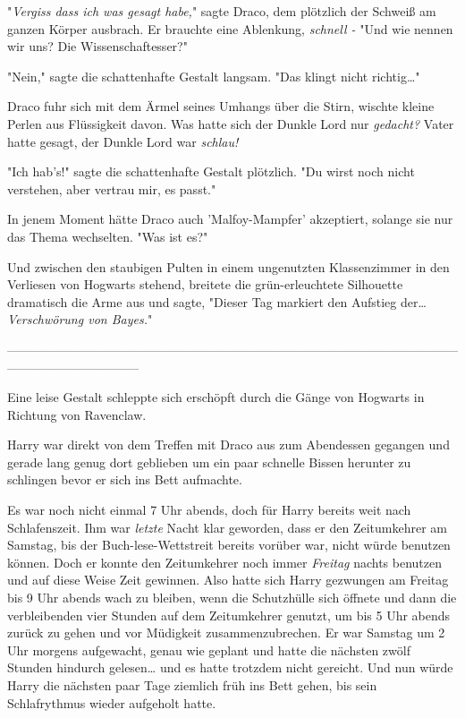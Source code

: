 {"\emph{Vergiss dass ich was gesagt habe,}" sagte Draco, dem plötzlich der Schweiß am ganzen Körper ausbrach. Er brauchte eine Ablenkung, \emph{schnell -} "Und wie nennen wir uns? Die Wissenschaftesser?"

"Nein," sagte die schattenhafte Gestalt langsam. "Das klingt nicht richtig…"

Draco fuhr sich mit dem Ärmel seines Umhangs über die Stirn, wischte kleine Perlen aus Flüssigkeit davon. Was hatte sich der Dunkle Lord nur \emph{gedacht?} Vater hatte gesagt, der Dunkle Lord war \emph{schlau!}

"Ich hab's!" sagte die schattenhafte Gestalt plötzlich. "Du wirst noch nicht verstehen, aber vertrau mir, es passt."

In jenem Moment hätte Draco auch 'Malfoy-Mampfer' akzeptiert, solange sie nur das Thema wechselten. "Was ist es?"

Und zwischen den staubigen Pulten in einem ungenutzten Klassenzimmer in den Verliesen von Hogwarts stehend, breitete die grün-erleuchtete Silhouette dramatisch die Arme aus und sagte, "Dieser Tag markiert den Aufstieg der… \emph{Verschwörung von Bayes.}"

--------------------------------------------------------------------------------------------------------------------------------------------

Eine leise Gestalt schleppte sich erschöpft durch die Gänge von Hogwarts in Richtung von Ravenclaw.

Harry war direkt von dem Treffen mit Draco aus zum Abendessen gegangen und gerade lang genug dort geblieben um ein paar schnelle Bissen herunter zu schlingen bevor er sich ins Bett aufmachte.

Es war noch nicht einmal 7 Uhr abends, doch für Harry bereits weit nach Schlafenszeit. Ihm war \emph{letzte} Nacht klar geworden, dass er den Zeitumkehrer am Samstag, bis der Buch-lese-Wettstreit bereits vorüber war, nicht würde benutzen können. Doch er konnte den Zeitumkehrer noch immer \emph{Freitag} nachts benutzen und auf diese Weise Zeit gewinnen. Also hatte sich Harry gezwungen am Freitag bis 9 Uhr abends wach zu bleiben, wenn die Schutzhülle sich öffnete und dann die verbleibenden vier Stunden auf dem Zeitumkehrer genutzt, um bis 5 Uhr abends zurück zu gehen und vor Müdigkeit zusammenzubrechen. Er war Samstag um 2 Uhr morgens aufgewacht, genau wie geplant und hatte die nächsten zwölf Stunden hindurch gelesen… und es hatte trotzdem nicht gereicht. Und nun würde Harry die nächsten paar Tage ziemlich früh ins Bett gehen, bis sein Schlafrythmus wieder aufgeholt hatte.

}
